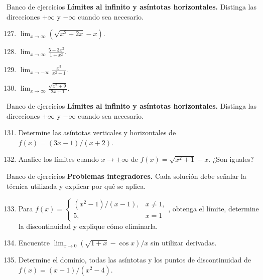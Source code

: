 \documentclass[12pt,aspectratio=169]{beamer}
\begin{document}
\begin{frame}[t,allowframebreaks]{Banco de ejercicios}
\small
\noindent \textbf{Límites al infinito y asíntotas horizontales.} Distinga las direcciones $+\infty$ y $-\infty$ cuando sea necesario.\par\smallskip
\begin{enumerate}\setcounter{enumi}{126}
\item $\displaystyle\lim_{x\to\infty}(\sqrt{x^2+2x}-x)$.
\item $\displaystyle\lim_{x\to\infty}\frac{5-3x^2}{1+x^2}$.
\item $\displaystyle\lim_{x\to-\infty}\frac{x^3}{x^2+1}$.
\item $\displaystyle\lim_{x\to\infty}\frac{\sqrt{x^2+9}}{2x+1}$.
\end{enumerate}
\end{frame}


\begin{frame}[t,allowframebreaks]{Banco de ejercicios}
\small
\noindent \textbf{Límites al infinito y asíntotas horizontales.} Distinga las direcciones $+\infty$ y $-\infty$ cuando sea necesario.\par\smallskip
\begin{enumerate}\setcounter{enumi}{130}
\item Determine las asíntotas verticales y horizontales de $f(x)=(3x-1)/(x+2)$.
\item Analice los límites cuando $x\to\pm\infty$ de $f(x)=\sqrt{x^2+1}-x$. ¿Son iguales?
\end{enumerate}
\end{frame}


\begin{frame}[t,allowframebreaks]{Banco de ejercicios}
\small
\noindent \textbf{Problemas integradores.} Cada solución debe señalar la técnica utilizada y explicar por qué se aplica.\par\smallskip
\begin{enumerate}\setcounter{enumi}{132}
\item Para $f(x)=\begin{cases}(x^2-1)/(x-1),&x\ne1,\\5,&x=1\end{cases}$, obtenga el límite, determine la discontinuidad y explique cómo eliminarla.
\item Encuentre $\lim_{x\to0}(\sqrt{1+x}-\cos x)/x$ sin utilizar derivadas.
\item Determine el dominio, todas las asíntotas y los puntos de discontinuidad de $f(x)=(x-1)/(x^2-4)$.
\end{enumerate}
\end{frame}
\end{document}
